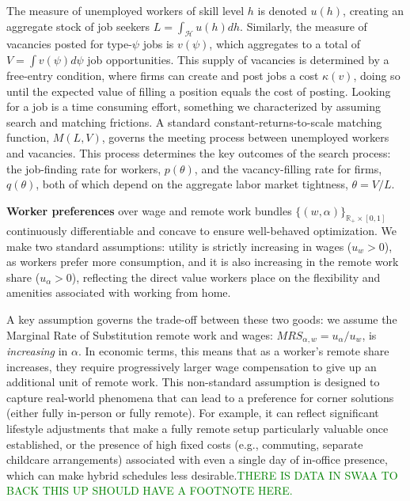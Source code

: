 \documentclass[
  11pt,
  letterpaper,
  DIV=11,
  numbers=noendperiod]{scrartcl}
\begin{document}
The measure of unemployed workers of skill level \(h\) is denoted
\(u(h)\), creating an aggregate stock of job seekers
\(L=\int_{\mathcal{H}}u(h)dh\). Similarly, the measure of vacancies
posted for type-\(\psi\) jobs is \(v(\psi)\), which aggregates to a
total of \(V=\int v(\psi)d\psi\) job opportunities. This supply of
vacancies is determined by a free-entry condition, where firms can
create and post jobs a cost \(\kappa(v)\), doing so until the expected
value of filling a position equals the cost of posting. Looking for a
job is a time consuming effort, something we characterized by assuming
search and matching frictions. A standard constant-returns-to-scale
matching function, \(M(L,V)\), governs the meeting process between
unemployed workers and vacancies. This process determines the key
outcomes of the search process: the job-finding rate for workers,
\(p(\theta)\), and the vacancy-filling rate for firms, \(q(\theta)\),
both of which depend on the aggregate labor market tightness,
\(\theta = V/L\).

\textbf{Worker preferences} over wage and remote work bundles
\(\{(w, \alpha)\}_{\mathbb{R}_{+}\times[0,1]}\) continuously
differentiable and concave to ensure well-behaved optimization. We make
two standard assumptions: utility is strictly increasing in wages
(\(u_w > 0\)), as workers prefer more consumption, and it is also
increasing in the remote work share (\(u_\alpha > 0\)), reflecting the
direct value workers place on the flexibility and amenities associated
with working from home.

A key assumption governs the trade-off between these two goods: we
assume the Marginal Rate of Substitution remote work and wages:
\(MRS_{\alpha,w} = u_\alpha / u_w\), is \emph{increasing} in \(\alpha\).
In economic terms, this means that as a worker's remote share increases,
they require progressively larger wage compensation to give up an
additional unit of remote work. This non-standard assumption is designed
to capture real-world phenomena that can lead to a preference for corner
solutions (either fully in-person or fully remote). For example, it can
reflect significant lifestyle adjustments that make a fully remote setup
particularly valuable once established, or the presence of high fixed
costs (e.g., commuting, separate childcare arrangements) associated with
even a single day of in-office presence, which can make hybrid schedules
less
desirable.\textcolor{green}{THERE IS DATA IN SWAA TO BACK THIS UP SHOULD HAVE A FOOTNOTE HERE.}
\end{document}
